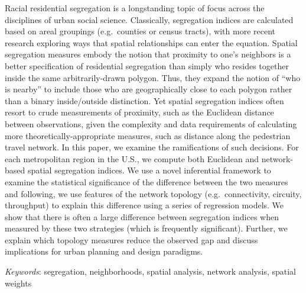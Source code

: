 \documentclass[
  10pt,
]{article}
\renewenvironment{abstract}
 {{%
    \setlength{\leftmargin}{0mm}
    \setlength{\rightmargin}{\leftmargin}%
  }%
  \relax}
 {\endlist}
\begin{document}
\begin{abstract}


    \vskip 8.5pt %

\noindent \small{Racial residential segregation is a longstanding topic
of focus across the disciplines of urban social science. Classically,
segregation indices are calculated based on areal groupings
(e.g.~counties or census tracts), with more recent research exploring
ways that spatial relationships can enter the equation. Spatial
segregation measures embody the notion that proximity to one's neighbors
is a better specification of residential segregation than simply who
resides together inside the same arbitrarily-drawn polygon. Thus, they
expand the notion of ``who is nearby'' to include those who are
geographically close to each polygon rather than a binary inside/outside
distinction. Yet spatial segregation indices often resort to crude
measurements of proximity, such as the Euclidean distance between
observations, given the complexity and data requirements of calculating
more theoretically-appropriate measures, such as distance along the
pedestrian travel network. In this paper, we examine the ramifications
of such decisions. For each metropolitan region in the U.S., we compute
both Euclidean and network-based spatial segregation indices. We use a
novel inferential framework to examine the statistical significance of
the difference between the two measures and following, we use features
of the network topology (e.g.~connectivity, circuity, throughput) to
explain this difference using a series of regression models. We show
that there is often a large difference between segregation indices when
measured by these two strategies (which is frequently significant).
Further, we explain which topology measures reduce the observed gap and
discuss implications for urban planning and design paradigms.}


\vskip 8.5pt \noindent \emph{Keywords}: segregation, neighborhoods,
spatial analysis, network analysis, spatial weights \par




\end{abstract}


\vskip -8.5pt



\end{document}
